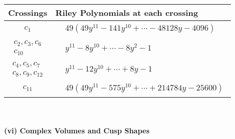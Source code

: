 \documentclass[1p]{elsarticle_modified}
\theoremstyle{definition}
\begin{document}
\begin{tabular}{m{50pt}|m{274pt}}
Crossings & \hspace{64pt}Riley Polynomials at each crossing \\
\hline $$\begin{aligned}c_{1}\end{aligned}$$&$\begin{aligned}
&49(49 y^{11}-141 y^{10}+\cdots-48128 y-4096)
\end{aligned}$\\
\hline $$\begin{aligned}c_{2},c_{3},c_{6}\\c_{10}\end{aligned}$$&$\begin{aligned}
&y^{11}-8 y^{10}+\cdots-8 y^2-1
\end{aligned}$\\
\hline $$\begin{aligned}c_{4},c_{5},c_{7}\\c_{8},c_{9},c_{12}\end{aligned}$$&$\begin{aligned}
&y^{11}-12 y^{10}+\cdots+8 y-1
\end{aligned}$\\
\hline $$\begin{aligned}c_{11}\end{aligned}$$&$\begin{aligned}
&49(49 y^{11}-575 y^{10}+\cdots+214784 y-25600)
\end{aligned}$\\
\hline
\end{tabular}\\~\\
\newpage\flushleft \textbf{(vi) Complex Volumes and Cusp Shapes}
\end{document}
